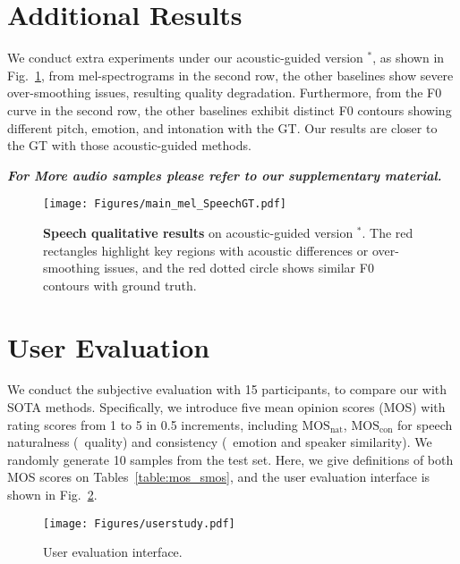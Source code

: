 \section{Additional Results}
\label{sec:results}
We conduct extra experiments under our acoustic-guided version \methodname$^*$, as shown in Fig.~\ref{fig:mel-speech-guided}, from mel-spectrograms in the second row, the other baselines show severe over-smoothing issues, resulting quality degradation. 
Furthermore, from the F0 curve in the second row, the other baselines exhibit distinct F0 contours showing different pitch, emotion, and intonation with the GT.
Our results are closer to the GT with those acoustic-guided methods. 

\textbf{\textit{For More audio samples please refer to our supplementary material.}}

\begin{figure}[htbp]
    \centering
    \texttt{[image: Figures/main\_mel\_SpeechGT.pdf]}
    \caption{\textbf{Speech qualitative results} on acoustic-guided version \methodname$^*$. The red rectangles highlight key regions with acoustic differences or over-smoothing issues, and the red dotted circle shows similar F0 contours with ground truth. }
    \label{fig:mel-speech-guided}
\end{figure}

\newpage
\section{User Evaluation}
\label{sec:user}
We conduct the subjective evaluation with 15 participants, to compare our \methodname with SOTA methods.
Specifically, we introduce five mean opinion scores (MOS) with rating scores from 1 to 5 in 0.5 increments, including $\text{MOS}_\text{nat}$, $\text{MOS}_\text{con}$ for speech naturalness (\ie~quality) and consistency (\ie~emotion and speaker similarity). We randomly generate 10 samples from the test set. 
Here, we give definitions of both MOS scores on Tables~\ref{table:mos_smos}, and the user evaluation interface is shown in Fig.~\ref{fig:userstudy}.

\begin{figure}[h]
    \centering
    \texttt{[image: Figures/userstudy.pdf]}
    \caption{User evaluation interface.}
    \label{fig:userstudy}
\end{figure}

